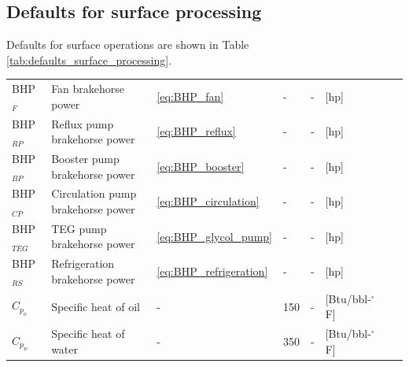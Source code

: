 \documentclass[11pt]{report}
\begin{document}
\subsection{Defaults for surface processing}

Defaults for surface operations are shown in Table \ref{tab:defaults_surface_processing}.


\begin{landscape}
\begin{scriptsize}
\tablelasttail{\bottomrule}
\label{tab:defaults_surface_processing}
\begin{supertabular*}{1\columnwidth}
{p{0.08\columnwidth}p{0.26\columnwidth}p{0.05\columnwidth}p{0.1\columnwidth}p{0.06\columnwidth}p{0.15\columnwidth}p{0.11\columnwidth}p{0.05\columnwidth}}
BHP$_{F}$ & Fan brakehorse power & \eqref{eq:BHP_fan} & - & - & [hp] & \cite[p. 118]{Manning1991} & \\ 
BHP$_{RP}$ & Reflux pump brakehorse power & \eqref{eq:BHP_reflux} & - & - & [hp] & \cite[p. 118]{Manning1991} & \\ 
BHP$_{BP}$ & Booster pump brakehorse power & \eqref{eq:BHP_booster} & - & - & [hp] & \cite[p. 118]{Manning1991} & \\ 
BHP$_{CP}$ & Circulation pump brakehorse power & \eqref{eq:BHP_circulation} & - & - & [hp] & \cite[p. 118]{Manning1991} & \\ 
BHP$_{TEG}$ & TEG pump brakehorse power & \eqref{eq:BHP_glycol_pump} & - & - & [hp] & \cite[p. 455]{Mcallister2009} & \\
BHP$_{RS}$ & Refrigeration brakehorse power & \eqref{eq:BHP_refrigeration} & - & - & [hp] & \cite{Nawaz2010} & \\
$C_{p_{o}}$ & Specific heat of oil & - & 150 & - & [Btu/bbl-$^{\circ}${F}] & \cite[p. 136]{Manning1995} & \\ 
$C_{p_{w}}$ & Specific heat of water & - & 350 & - & [Btu/bbl-$^{\circ}${F}] & \cite[p. 136]{Manning1995} & \\ 

\end{supertabular*}
\end{scriptsize}
\end{landscape}
\end{document}
